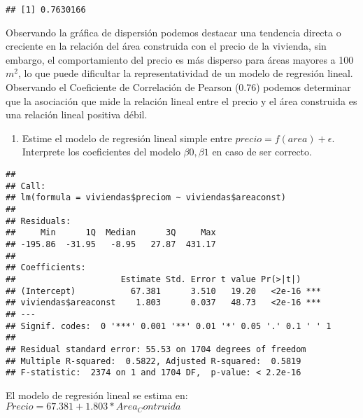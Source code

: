 \documentclass[
]{article}
\newenvironment{Shaded}{\begin{snugshade}}{\end{snugshade}}
\newcommand{\FunctionTok}[1]{\textcolor[rgb]{0.00,0.00,0.00}{#1}}
\newcommand{\NormalTok}[1]{#1}
\newcommand{\OtherTok}[1]{\textcolor[rgb]{0.56,0.35,0.01}{#1}}
\newcommand{\SpecialCharTok}[1]{\textcolor[rgb]{0.00,0.00,0.00}{#1}}
\providecommand{\tightlist}{%
  \setlength{\itemsep}{0pt}\setlength{\parskip}{0pt}}
\begin{document}
\begin{verbatim}
## [1] 0.7630166
\end{verbatim}

Observando la gráfica de dispersión podemos destacar una tendencia
directa o creciente en la relación del área construida con el precio de
la vivienda, sin embargo, el comportamiento del precio es más disperso
para áreas mayores a 100 \(m^2\), lo que puede dificultar la
representatividad de un modelo de regresión lineal. Observando el
Coeficiente de Correlación de Pearson (0.76) podemos determinar que la
asociación que mide la relación lineal entre el precio y el área
construida es una relación lineal positiva débil.

\begin{enumerate}
\def\labelenumi{\arabic{enumi}.}
\setcounter{enumi}{2}
\tightlist
\item
  Estime el modelo de regresión lineal simple entre
  \(precio=f(area)+\epsilon\). Interprete los coeficientes del modelo
  \(\beta0, \beta1\) en caso de ser correcto.
\end{enumerate}

\begin{Shaded}
\end{Shaded}

\begin{verbatim}
## 
## Call:
## lm(formula = viviendas$preciom ~ viviendas$areaconst)
## 
## Residuals:
##     Min      1Q  Median      3Q     Max 
## -195.86  -31.95   -8.95   27.87  431.17 
## 
## Coefficients:
##                     Estimate Std. Error t value Pr(>|t|)    
## (Intercept)           67.381      3.510   19.20   <2e-16 ***
## viviendas$areaconst    1.803      0.037   48.73   <2e-16 ***
## ---
## Signif. codes:  0 '***' 0.001 '**' 0.01 '*' 0.05 '.' 0.1 ' ' 1
## 
## Residual standard error: 55.53 on 1704 degrees of freedom
## Multiple R-squared:  0.5822, Adjusted R-squared:  0.5819 
## F-statistic:  2374 on 1 and 1704 DF,  p-value: < 2.2e-16
\end{verbatim}

El modelo de regresión lineal se estima en:
\(Precio = 67.381 + 1.803 * Area_Contruida\)
\end{document}
